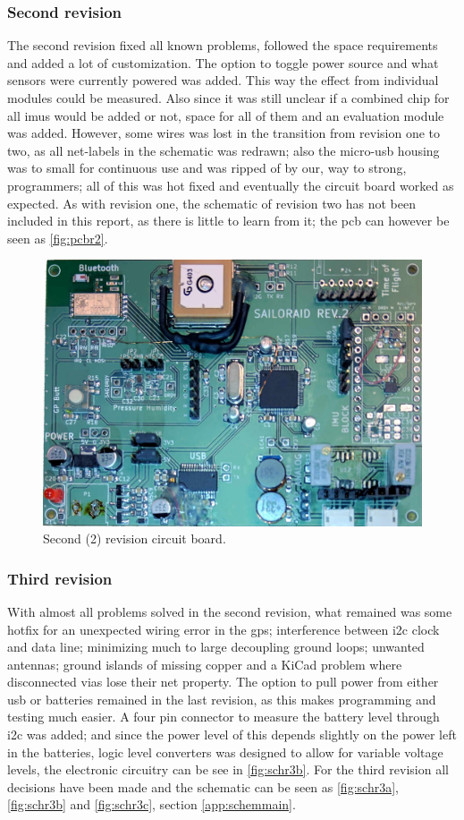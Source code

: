 \subsubsection{Second revision}
The second revision fixed all known problems, followed the space requirements and added a lot of customization. The option to toggle power source and what sensors were currently powered was added. This way the effect from individual modules could be measured. Also since it was still unclear if a combined chip for all \gls{imu}s would be added or not, space for all of them and an evaluation module was added. However, some wires was lost in the transition from revision one to two, as all net-labels in the schematic was redrawn; also the micro-\gls{usb} housing was to small for continuous use and was ripped of by our, way to strong, programmers; all of this was hot fixed and eventually the circuit board worked as expected. As with revision one, the schematic of revision two has not been included in this report, as there is little to learn from it; the \gls{pcb} can however be seen as \autoref{fig:pcbr2}.
\begin{figure}[H]
	\centering
	\includegraphics[width=.8\linewidth]{Figures/pcb_rev2.jpg}
	\caption{Second (2) revision circuit board.}
	\label{fig:pcbr2}
\end{figure}

\subsubsection{Third revision}
With almost all problems solved in the second revision, what remained was some hotfix for an unexpected wiring error in the \gls{gps}; interference between \gls{i2c} clock and data line; minimizing much to large decoupling ground loops; unwanted antennas; ground islands of missing copper and a KiCad problem where disconnected \gls{via}s lose their net property. The option to pull power from either \gls{usb} or batteries remained in the last revision, as this makes programming and testing much easier. A four pin connector to measure the battery level through \gls{i2c} was added; and since the power level of this depends slightly on the power left in the batteries, logic level converters was designed to allow for variable voltage levels\cite{llc}, the electronic circuitry can be see in \autoref{fig:schr3b}.
For the third revision all decisions have been made and the schematic can be seen as \autoref{fig:schr3a}, \ref{fig:schr3b} and \ref{fig:schr3c}, section \ref{app:schemmain}.

